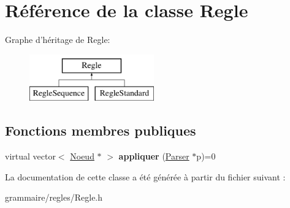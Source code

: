 \hypertarget{class_regle}{\section{Référence de la classe Regle}
\label{class_regle}
}
Graphe d'héritage de Regle\-:\begin{figure}[H]
\begin{center}
\leavevmode
\includegraphics[height=2.000000cm]{class_regle}
\end{center}
\end{figure}
\subsection*{Fonctions membres publiques}
\begin{DoxyCompactItemize}
\item 
\hypertarget{class_regle_a1c56ca5ad1d119d177239c35b0e4410b}{virtual vector$<$ \hyperlink{class_noeud}{Noeud} $\ast$ $>$ {\bfseries appliquer} (\hyperlink{class_parser}{Parser} $\ast$p)=0}\label{class_regle_a1c56ca5ad1d119d177239c35b0e4410b}

\end{DoxyCompactItemize}


La documentation de cette classe a été générée à partir du fichier suivant \-:\begin{DoxyCompactItemize}
\item 
grammaire/regles/Regle.\-h\end{DoxyCompactItemize}
